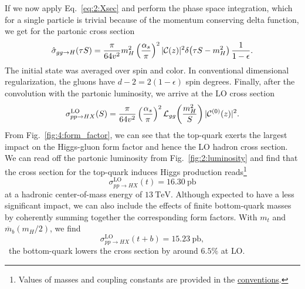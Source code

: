 If we now apply Eq.~\eqref{eq:2:Xsec} and perform the phase space integration, which for a single particle is trivial because of the momentum conserving delta function, we get for the partonic cross section
\begin{equation}
\hat{\sigma}_{gg \rightarrow H}(\tau S) = \frac{\pi}{64 v^2} m_H^2 \left( \frac{\alpha_s}{\pi} \right)^2 |\mathcal{C}(z)|^2 \delta\! \left(\tau S - m_H^2 \right) \frac{1}{1 - \epsilon}.
\label{eq:4:ggH_cross_section}
\end{equation}
The initial state was averaged over spin and color. In conventional dimensional regularization, the gluons have $d - 2 = 2 (1 - \epsilon)$ spin degrees. Finally, after the convolution with the partonic luminosity, we arrive at the LO cross section
\begin{equation}
\sigma_{pp \rightarrow HX}^{\text{LO}}(S) = \frac{\pi}{64v^2} \left(\frac{\alpha_s}{\pi} \right)^2 \mathcal{L}_{gg}\!\left(\frac{m_H^2}{S} \right) |\mathcal{C}^{(0)}(z)|^2.
\end{equation}
From Fig.~\ref{fig:4:form_factor}, we can see that the top-quark exerts the largest impact on the Higgs-gluon form factor and hence the \acs{LO} hadron cross section. We can read off the partonic luminosity from Fig.~\ref{fig:2:luminosity} and find that the cross section for the top-quark induces Higgs production reads\footnote{Values of masses and coupling constants are provided in the \hyperref[chap:notation_and_conventions]{conventions}.}
\begin{equation}
\sigma_{pp \rightarrow HX}^{\text{LO}} (t) = 16.30\ \mathrm{pb}
\end{equation}
at a hadronic center-of-mass energy of $13\ \text{TeV}$. Although expected to have a less significant impact, we can also include the effects of finite bottom-quark masses by coherently summing together the corresponding form factors. With $m_t$ and $\overline{m}_b(m_H/2)$, we find
\begin{equation}
\sigma_{pp \rightarrow HX}^{\text{LO}}(t+b) = 15.23\ \mathrm{pb},
\end{equation}
\ie\ the bottom-quark lowers the cross section by around $6.5\%$ at \acs{LO}.

